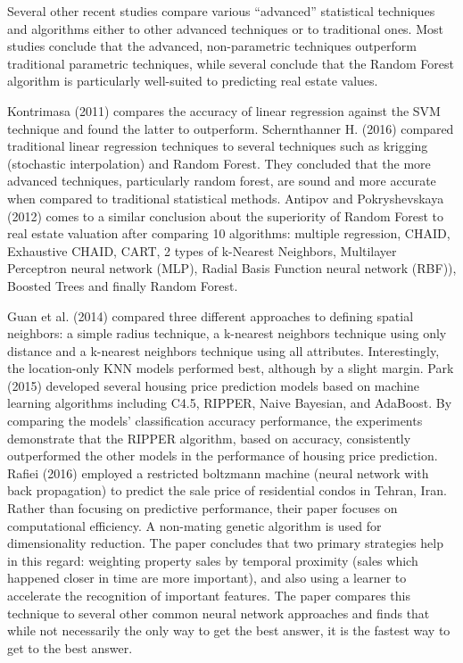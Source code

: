 \documentclass[]{article}
\begin{document}
Several other recent studies compare various ``advanced'' statistical
techniques and algorithms either to other advanced techniques or to
traditional ones. Most studies conclude that the advanced,
non-parametric techniques outperform traditional parametric techniques,
while several conclude that the Random Forest algorithm is particularly
well-suited to predicting real estate values.

Kontrimasa (2011) compares the accuracy of linear regression against the
SVM technique and found the latter to outperform. Schernthanner H.
(2016) compared traditional linear regression techniques to several
techniques such as krigging (stochastic interpolation) and Random
Forest. They concluded that the more advanced techniques, particularly
random forest, are sound and more accurate when compared to traditional
statistical methods. Antipov and Pokryshevskaya (2012) comes to a
similar conclusion about the superiority of Random Forest to real estate
valuation after comparing 10 algorithms: multiple regression, CHAID,
Exhaustive CHAID, CART, 2 types of k-Nearest Neighbors, Multilayer
Perceptron neural network (MLP), Radial Basis Function neural network
(RBF)), Boosted Trees and finally Random Forest.

Guan et al. (2014) compared three different approaches to defining
spatial neighbors: a simple radius technique, a k-nearest neighbors
technique using only distance and a k-nearest neighbors technique using
all attributes. Interestingly, the location-only KNN models performed
best, although by a slight margin. Park (2015) developed several housing
price prediction models based on machine learning algorithms including
C4.5, RIPPER, Naive Bayesian, and AdaBoost. By comparing the models'
classification accuracy performance, the experiments demonstrate that
the RIPPER algorithm, based on accuracy, consistently outperformed the
other models in the performance of housing price prediction. Rafiei
(2016) employed a restricted boltzmann machine (neural network with back
propagation) to predict the sale price of residential condos in Tehran,
Iran. Rather than focusing on predictive performance, their paper
focuses on computational efficiency. A non-mating genetic algorithm is
used for dimensionality reduction. The paper concludes that two primary
strategies help in this regard: weighting property sales by temporal
proximity (sales which happened closer in time are more important), and
also using a learner to accelerate the recognition of important
features. The paper compares this technique to several other common
neural network approaches and finds that while not necessarily the only
way to get the best answer, it is the fastest way to get to the best
answer.
\end{document}
